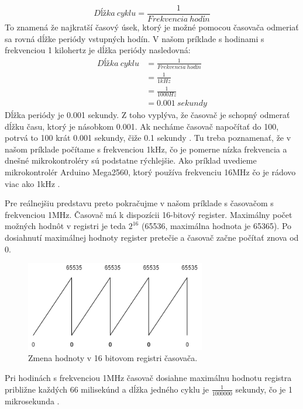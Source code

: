 \[Dĺžka\:cyklu =\frac{1}{Frekvencia\:hodín}\]
To znamená že najkratší časový úsek, ktorý je možné pomocou časovača odmeriať sa
rovná dĺžke periódy vstupných hodín. V našom príklade s hodinami s frekvenciou 1 kilohertz je dĺžka periódy nasledovná:
\begin{equation}
    \begin{aligned}
        Dĺžka\:cyklu & = \frac{1}{Frekvencia\:hodín} \\
                     & = \frac{1}{1kHz}              \\
                     & = \frac{1}{ 1000 Hz}          \\
                     & =  0.001\:sekundy
    \end{aligned}
\end{equation}
Dĺžka periódy je 0.001 sekundy. Z toho vyplýva, že časovač je schopný odmerať dĺžku času, ktorý je násobkom 0.001. Ak necháme časovač napočítať do 100, potrvá to 100 krát 0.001 sekundy, čiže 0.1 sekundy \cite{cameraNewbieGuideAVR2015}. Tu treba poznamenať, že v našom príklade počítame s frekvenciou 1kHz, čo je pomerne nízka frekvencia a dnešné mikrokontroléry sú podstatne rýchlejšie. Ako príklad uvedieme mikrokontrolér Arduino Mega2560, ktorý používa frekvenciu 16MHz čo je rádovo viac ako 1kHz \cite{ArduinoMega2560}.
\par Pre reálnejšiu predstavu preto pokračujme v našom príklade s časovačom s frekvenciou 1MHz. Časovač má k dispozícii 16-bitový register. Maximálny počet
možných hodnôt v registri je teda $2^{16}$ (65536, maximálna hodnota je 65365).
Po dosiahnutí maximálnej hodnoty register pretečie a časovač začne počítať znova od 0.
\begin{figure}[!h]
    \centering
    \includegraphics[width=0.70\textwidth]{img/timer.png}
    \caption{Zmena hodnoty v 16 bitovom registri časovača.}
    \label{figure:timer1}
\end{figure}

Pri hodinách s frekvenciou 1MHz časovač dosiahne maximálnu hodnotu registra približne každých 66 milisekúnd a dĺžka jedného cyklu je $\frac{1}{1000000}$ sekundy, čo je 1 mikrosekunda \cite{cameraNewbieGuideAVR2015}.

